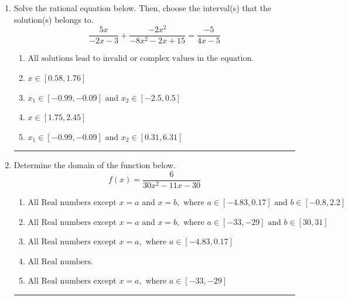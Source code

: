 \documentclass[14pt]{extbook}
\newcommand{\litem}[1]{\item#1\hspace*{-1cm}\rule{\textwidth}{0.4pt}}
\begin{document}
\begin{enumerate}
{\begin{enumerate}[label=\Alph*.]
\end{enumerate} }
\litem{
Solve the rational equation below. Then, choose the interval(s) that the solution(s) belongs to.\[ \frac{5x}{-2x -3} + \frac{-2x^{2}}{-8x^{2} -2 x + 15} = \frac{-5}{4x -5} \]\begin{enumerate}[label=\Alph*.]
\item \( \text{All solutions lead to invalid or complex values in the equation.} \)
\item \( x \in [0.58,1.76] \)
\item \( x_1 \in [-0.99, -0.09] \text{ and } x_2 \in [-2.5,0.5] \)
\item \( x \in [1.75,2.45] \)
\item \( x_1 \in [-0.99, -0.09] \text{ and } x_2 \in [0.31,6.31] \)

\end{enumerate} }
\litem{
Determine the domain of the function below.\[ f(x) = \frac{6}{30x^{2} -11 x -30} \]\begin{enumerate}[label=\Alph*.]
\item \( \text{All Real numbers except } x = a \text{ and } x = b, \text{ where } a \in [-4.83, 0.17] \text{ and } b \in [-0.8, 2.2] \)
\item \( \text{All Real numbers except } x = a \text{ and } x = b, \text{ where } a \in [-33, -29] \text{ and } b \in [30, 31] \)
\item \( \text{All Real numbers except } x = a, \text{ where } a \in [-4.83, 0.17] \)
\item \( \text{All Real numbers.} \)
\item \( \text{All Real numbers except } x = a, \text{ where } a \in [-33, -29] \)

\end{enumerate} }
\end{enumerate}
\end{document}
